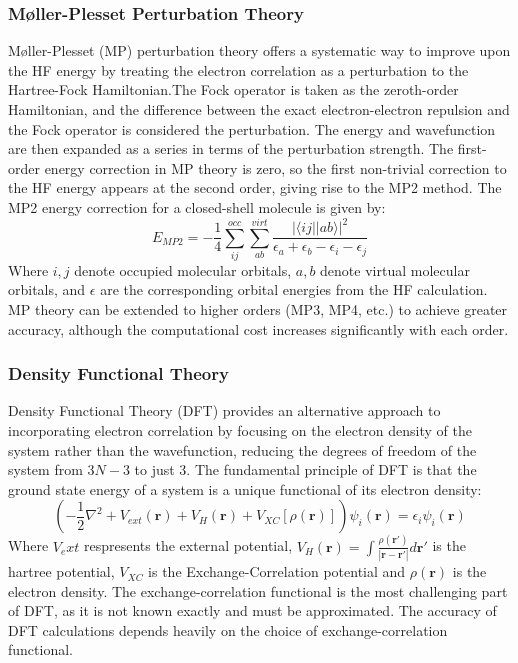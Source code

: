 \subsubsection{Møller-Plesset Perturbation Theory}
Møller-Plesset (MP) perturbation theory offers a systematic way to improve upon the HF energy by treating the electron correlation as a perturbation to the Hartree-Fock Hamiltonian.The Fock operator is taken as the zeroth-order Hamiltonian, and the difference between the exact electron-electron repulsion and the Fock operator is considered the perturbation. The energy and wavefunction are then expanded as a series in terms of the perturbation strength. The first-order energy correction in MP theory is zero, so the first non-trivial correction to the HF energy appears at the second order, giving rise to the MP2 method. The MP2 energy correction for a closed-shell molecule is given by:
\begin{equation} \label{eq:MP2}
    E_{MP2} = - \frac{1}{4} \sum_{ij}^{occ} \sum_{ab}^{virt} \frac{|\langle i j || a b \rangle|^2}{\epsilon_a + \epsilon_b - \epsilon_i - \epsilon_j}
\end{equation}
Where $i,j$ denote occupied molecular orbitals, $a,b$ denote virtual molecular orbitals, and $\epsilon$ are the corresponding orbital energies from the HF calculation. MP theory can be extended to higher orders (MP3, MP4, etc.) to achieve greater accuracy, although the computational cost increases significantly with each order.

\subsubsection{Density Functional Theory}
Density Functional Theory (DFT) provides an alternative approach to incorporating electron correlation by focusing on the electron density of the system rather than the wavefunction, reducing the degrees of freedom of the system from $3N-3$ to just $3$. The fundamental principle of DFT is that the ground state energy of a system is a unique functional of its electron density:
\begin{equation}\label{eq:KSDFT}
    \left( -\frac{1}{2} \nabla^2 + V_{ext}(\mathbf{r}) + V_H(\mathbf{r}) + V_{XC}[\rho(\mathbf{r})] \right) \psi_i(\mathbf{r}) = \epsilon_i \psi_i(\mathbf{r})
\end{equation}
Where $V_ext$ respresents the external potential, $V_H(\mathbf{r}) = \int \frac{\rho(\mathbf{r}')}{|\mathbf{r} - \mathbf{r}'|} d\mathbf{r}'$ is the hartree potential, $V_{XC}$ is the Exchange-Correlation potential and $\rho(\mathbf{r})$ is the electron density. The exchange-correlation functional is the most challenging part of DFT, as it is not known exactly and must be approximated. The accuracy of DFT calculations depends heavily on the choice of exchange-correlation functional.

